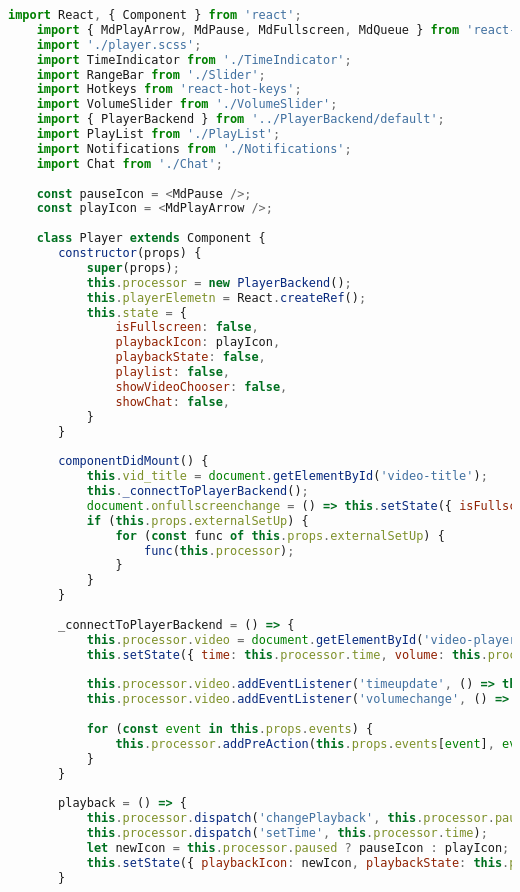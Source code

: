 \begin{lstlisting}[language=JavaScript,label={lst:add:player}]
    import React, { Component } from 'react';
    import { MdPlayArrow, MdPause, MdFullscreen, MdQueue } from 'react-icons/md';
    import './player.scss';
    import TimeIndicator from './TimeIndicator';
    import RangeBar from './Slider';
    import Hotkeys from 'react-hot-keys';
    import VolumeSlider from './VolumeSlider';
    import { PlayerBackend } from '../PlayerBackend/default';
    import PlayList from './PlayList';
    import Notifications from './Notifications';
    import Chat from './Chat';
     
    const pauseIcon = <MdPause />;
    const playIcon = <MdPlayArrow />;
     
    class Player extends Component {
       constructor(props) {
           super(props);
           this.processor = new PlayerBackend();
           this.playerElemetn = React.createRef();
           this.state = {
               isFullscreen: false,
               playbackIcon: playIcon,
               playbackState: false,
               playlist: false,
               showVideoChooser: false,
               showChat: false,
           }
       }
     
       componentDidMount() {
           this.vid_title = document.getElementById('video-title');
           this._connectToPlayerBackend();
           document.onfullscreenchange = () => this.setState({ isFullscreen: !this.state.isFullscreen });
           if (this.props.externalSetUp) {
               for (const func of this.props.externalSetUp) {
                   func(this.processor);
               }
           }
       }
     
       _connectToPlayerBackend = () => {
           this.processor.video = document.getElementById('video-player');
           this.setState({ time: this.processor.time, volume: this.processor.volume })
     
           this.processor.video.addEventListener('timeupdate', () => this.setState({ time: this.processor.time }));
           this.processor.video.addEventListener('volumechange', () => this.setState({ volume: this.processor.volume }));
     
           for (const event in this.props.events) {
               this.processor.addPreAction(this.props.events[event], event);
           }
       }
     
       playback = () => {
           this.processor.dispatch('changePlayback', this.processor.paused);
           this.processor.dispatch('setTime', this.processor.time);
           let newIcon = this.processor.paused ? pauseIcon : playIcon;
           this.setState({ playbackIcon: newIcon, playbackState: this.processor.paused });
       }
     

\end{lstlisting}
